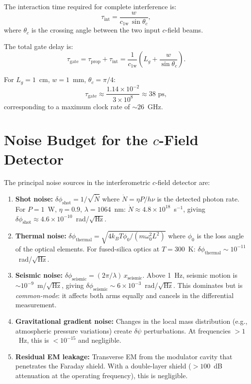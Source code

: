 \documentclass[aps,prd,twocolumn,superscriptaddress,nofootinbib,floatfix]{revtex4-2}
\newcommand{\psifield}{\psi}
\newcommand{\cfield}{c_{\text{1w}}}
\newcommand{\ee}[1]{\times 10^{#1}}
\begin{document}
The interaction time required for complete interference is:
\begin{equation}
\tau_{\text{int}} = \frac{w}{\cfield\,\sin\theta_c},
\label{eq:int_time}
\end{equation}
where $\theta_c$ is the crossing angle between the two input
$c$-field beams.

The total gate delay is:
\begin{equation}
\tau_{\text{gate}} = \tau_{\text{prop}} + \tau_{\text{int}}
= \frac{1}{\cfield}\!\left(L_g + \frac{w}{\sin\theta_c}\right).
\label{eq:gate_delay}
\end{equation}

For $L_g = 1$~cm, $w = 1$~mm, $\theta_c = \pi/4$:
\begin{equation}
\tau_{\text{gate}} \approx \frac{1.14\ee{-2}}{3\ee{8}}
\approx 38\text{ ps},
\label{eq:gate_delay_numerical}
\end{equation}
corresponding to a maximum clock rate of $\sim 26$~GHz.

\section{Noise Budget for the $c$-Field Detector}
\label{app:noise}

The principal noise sources in the interferometric $c$-field
detector are:

\begin{enumerate}
\item \textbf{Shot noise:}
$\delta\phi_{\text{shot}} = 1/\sqrt{\dot{N}}$
where $\dot{N} = \eta P/h\nu$ is the detected photon rate.
For $P = 1$~W, $\eta = 0.9$, $\lambda = 1064$~nm:
$\dot{N} \approx 4.8\ee{18}$~s$^{-1}$, giving
$\delta\phi_{\text{shot}} \approx 4.6\ee{-10}$~rad/$\sqrt{\text{Hz}}$.

\item \textbf{Thermal noise:}
$\delta\phi_{\text{thermal}} = \sqrt{4k_BT\phi_0/(m\omega_0^2 L^2)}$
where $\phi_0$ is the loss angle of the optical elements.
For fused-silica optics at $T = 300$~K:
$\delta\phi_{\text{thermal}} \sim 10^{-11}$~rad/$\sqrt{\text{Hz}}$.

\item \textbf{Seismic noise:}
$\delta\phi_{\text{seismic}} = (2\pi/\lambda)\,x_{\text{seismic}}$.
Above 1~Hz, seismic motion is $\sim 10^{-9}$~m/$\sqrt{\text{Hz}}$,
giving $\delta\phi_{\text{seismic}} \sim 6\ee{-3}$~rad/$\sqrt{\text{Hz}}$.
This dominates but is \emph{common-mode}: it affects both arms
equally and cancels in the differential measurement.

\item \textbf{Gravitational gradient noise:}
Changes in the local mass distribution (e.g., atmospheric pressure
variations) create $\delta\psifield$ perturbations.
At frequencies $> 1$~Hz, this is $< 10^{-15}$ and negligible.

\item \textbf{Residual EM leakage:}
Transverse EM from the modulator cavity that penetrates the Faraday
shield. With a double-layer shield ($> 100$~dB attenuation at the
operating frequency), this is negligible.
\end{enumerate}
\end{document}
